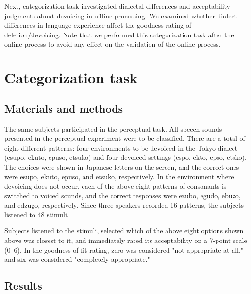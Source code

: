 \documentclass[a4paper,11pt,twocolumn]{article}
\begin{document}

Next, categorization task investigated dialectal differences and acceptability judgments about devoicing in offline processing. We examined whether dialect differences in language experience affect the goodness rating of deletion/devoicing. Note that we performed this categorization task after the online process to avoid any effect on the validation of the online process.

\section{Categorization task}

\subsection{Materials and methods}

The same subjects participated in the perceptual task. All speech sounds presented in the perceptual experiment were to be classified. There are a total of eight different patterns: four environments to be devoiced in the Tokyo dialect (esupo, ekuto, epuso, etsuko) and four devoiced settings (espo, ekto, epso, etsko). The choices were shown in Japanese letters on the screen, and the correct ones were esupo, ekuto, epuso, and etsuko, respectively. In the environment where devoicing does not occur, each of the above eight patterns of consonants is switched to voiced sounds, and the correct responses were ezubo, egudo, ebuzo, and edzugo, respectively. Since three speakers recorded 16 patterns, the subjects listened to 48 stimuli.

Subjects listened to the stimuli, selected which of the above eight options shown above was closest to it, and immediately rated its acceptability on a 7-point scale (0--6). In the goodness of fit rating, zero was considered "not appropriate at all," and six was considered "completely appropriate."

\subsection{Results}
\end{document}
